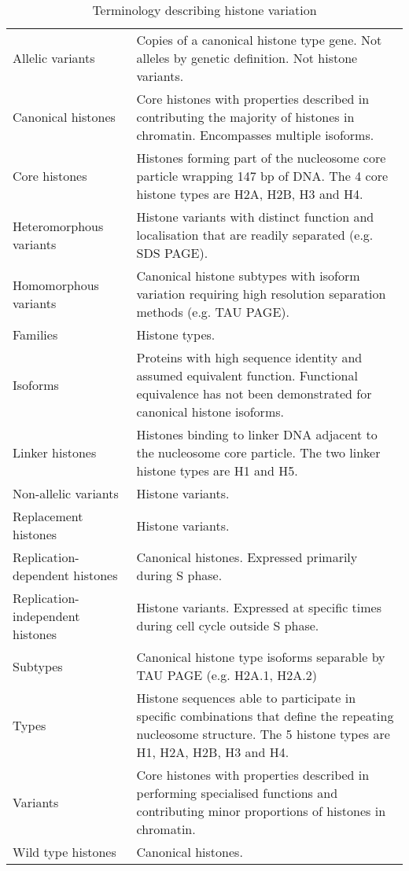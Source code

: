   \begin{table*}
    \caption{Terminology describing histone variation}
    \label{tab:histone-divisions}
    \centering
    \begin{tabular}{F p{\dimexpr(\textwidth--4\tabcolsep)}}
      \toprule
	  Allelic variants &
	  Copies of a canonical histone type gene. Not alleles by genetic definition. Not histone variants. 
	  \\
      \addlinespace
	  Canonical histones &
	  Core histones with properties described in  
	  contributing the majority of histones in chromatin.
	  Encompasses multiple isoforms.
	  \\
      \addlinespace
	  Core histones &
	  Histones forming part of the nucleosome core particle wrapping 147 bp of DNA.
	  The 4 core histone types are H2A, H2B, H3 and H4.
	  \\
      \addlinespace
	  Heteromorphous variants &
	  Histone variants with distinct function and localisation that are readily separated (e.g. SDS PAGE).
	  \\
      \addlinespace
	  Homomorphous variants &
	  Canonical histone subtypes with isoform variation 
	  requiring high resolution separation methods (e.g. TAU PAGE).
	  \\
      \addlinespace
	  Families &
	  Histone types.
	  \\
      \addlinespace
	  Isoforms &
	  Proteins with high sequence identity and assumed equivalent function. 
	  Functional equivalence has not been demonstrated for canonical histone isoforms.
	  \\
      \addlinespace
	  Linker histones &
	  Histones binding to linker DNA adjacent to the nucleosome core particle.
	  The two linker histone types are H1 and H5.
	  \\
      \addlinespace
	  Non-allelic variants &
	  Histone variants. \\
      \addlinespace
      Replacement histones &
	  Histone variants. \\
      \addlinespace
	  Replication-dependent histones &
	  Canonical histones. Expressed primarily during S phase. \\
      \addlinespace
	  Replication-independent histones &
	  Histone variants. Expressed at specific times during cell cycle outside S phase. \\
      \addlinespace
	  Subtypes &
	  Canonical histone type isoforms separable by TAU PAGE 
	  (e.g. H2A.1, H2A.2)
	  \\
      \addlinespace
	  Types &
	  Histone sequences able to participate in specific combinations 
	  that define the repeating nucleosome structure. 
	  The 5 histone types are H1, H2A, H2B, H3 and H4.
	  \\
      \addlinespace
	  Variants &
	  Core histones with properties described in  
	  performing specialised functions and contributing minor proportions of histones in chromatin. \\
      \addlinespace
	  Wild type histones &
	  Canonical histones. \\
      \bottomrule
    \end{tabular}
  \end{table*}

